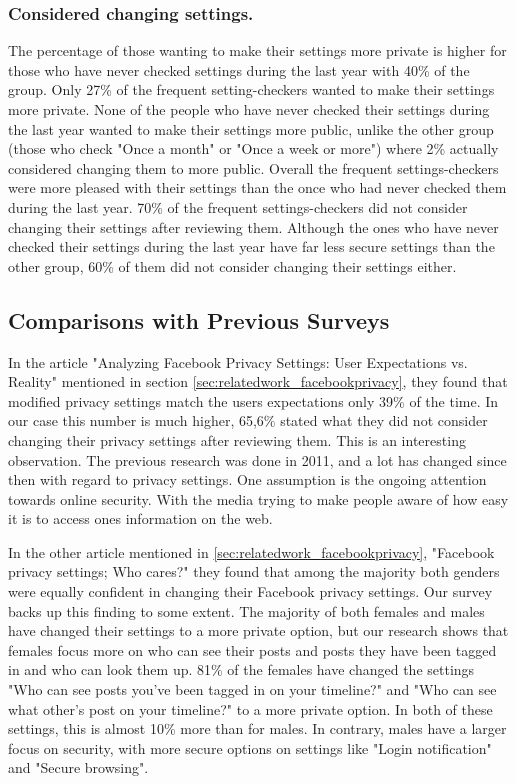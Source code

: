 \subsubsection{Considered changing settings.}
The percentage of those wanting to make their settings more private is higher for those who have never checked settings during the last year with 40\% of the group. Only 27\% of the frequent setting-checkers wanted to make their settings more private. 
None of the people who have never checked their settings during the last year wanted to make their settings more public, unlike the other group (those who check "Once a month" or "Once a week or more") where 2\% actually considered changing them to more public. Overall the frequent settings-checkers were more pleased with their settings than the once who had never checked them during the last year. 70\% of the frequent settings-checkers did not consider changing their settings after reviewing them. Although the ones who have never checked their settings during the last year have far less secure settings than the other group, 60\% of them did not consider changing their settings either. 

\subsection{Comparisons with Previous Surveys} 
In the article "Analyzing Facebook Privacy Settings: User Expectations vs. Reality" mentioned in section \ref{sec:relatedwork_facebookprivacy}, they found that modified privacy settings match the users expectations only 39\% of the time. In our case this number is much higher, 65,6\% stated what they did not consider changing their privacy settings after reviewing them. This is an interesting observation. The previous research was done in 2011, and a lot has changed since then with regard to privacy settings. One assumption is the ongoing attention towards online security. With the media trying to make people aware of how easy it is to access ones information on the web. 

In the other article mentioned in \ref{sec:relatedwork_facebookprivacy}, "Facebook privacy settings; Who cares?" they found that among the majority both genders were equally confident in changing their Facebook privacy settings. Our survey backs up this finding to some extent. The majority of both females and males have changed their settings to a more private option, but our research shows that females focus more on who can see their posts and posts they have been tagged in and who can look them up. 81\% of the females have changed the settings "Who can see posts you've been tagged in on your timeline?" and "Who can see what other's post on your timeline?" to a more private option. In both of these settings, this is almost 10\% more than for males. In contrary, males have a larger focus on security, with more secure options on settings like "Login notification" and "Secure browsing". 

